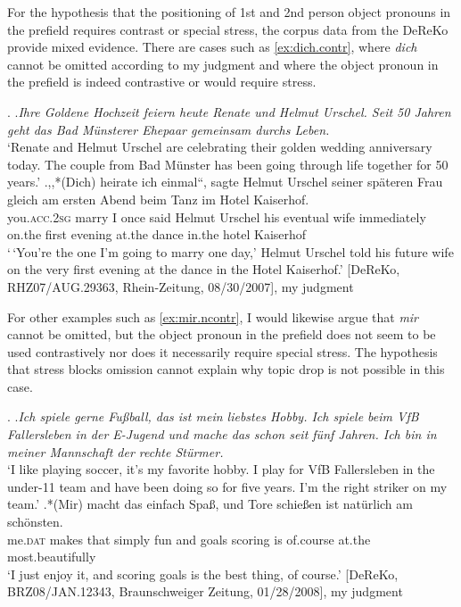 \largerpage
For the hypothesis that the positioning of 1st and 2nd person object pronouns in the prefield requires contrast or special stress, the corpus data from the DeReKo provide mixed evidence.
There are cases such as \ref{ex:dich.contr}, where \textit{dich} cannot be omitted according to my judgment and where the object pronoun in the prefield is indeed contrastive or would require stress.

\ex.\label{ex:dich.contr}
\a.\textit{Ihre Goldene Hochzeit feiern heute Renate und Helmut Urschel. Seit 50 Jahren geht das Bad Münsterer Ehepaar gemeinsam durchs Leben.}\\
`Renate and Helmut Urschel are celebrating their golden wedding anniversary today. The couple from Bad Münster has been going through life together for 50 years.'
\bg.,,*(Dich) heirate ich einmal``, sagte Helmut Urschel seiner späteren Frau gleich am ersten Abend beim Tanz im Hotel Kaiserhof.\\
you.\textsc{acc.2sg} marry I once said Helmut Urschel his eventual wife immediately on.the first evening at.the dance in.the hotel Kaiserhof\\
`\,`You're the one I'm going to marry one day,' Helmut Urschel told his future wife on the very first evening at the dance in the Hotel Kaiserhof.' [DeReKo, RHZ07/AUG.29363, Rhein-Zeitung, 08/30/2007], my judgment

For other examples such as \ref{ex:mir.ncontr}, I would likewise argue that \textit{mir} cannot be omitted, but the object pronoun in the prefield does not seem to be used contrastively nor does it necessarily require special stress.
The hypothesis that stress blocks omission cannot explain why topic drop is not possible in this case.

\ex.\label{ex:mir.ncontr}
\a.\textit{Ich spiele gerne Fußball, das ist mein liebstes Hobby. Ich spiele beim VfB Fallersleben in der E-Jugend und mache das schon seit fünf Jahren. Ich bin in meiner Mannschaft der rechte Stürmer.}\\
`I like playing soccer, it's my favorite hobby. I play for VfB Fallersleben in the under-11 team and have been doing so for five years. I'm the right striker on my team.'
\bg.*(Mir) macht das einfach Spaß, und Tore schießen ist natürlich am schönsten.\\
me.\textsc{dat} makes that simply fun and goals scoring is of.course at.the most.beautifully\\
`I just enjoy it, and scoring goals is the best thing, of course.' [DeReKo, BRZ08/JAN.12343, Braunschweiger Zeitung, 01/28/2008], my judgment

